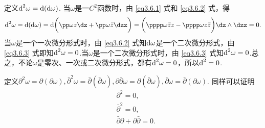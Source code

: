 定义$\textrm d^2\omega=\textrm d(\textrm d\omega)$. 当$\omega$是一$C^2$函数时，由 \eqref{eq3.6.1} 式和 \eqref{eq3.6.2} 式，得
\begin{equation}\label{eq3.6.4}
\textrm d^2\omega=\textrm d(\textrm d\omega)=\textrm d\bigg(
\pp\omega z\dz+\pp\omega{\bar z}\dzz\bigg)=\bigg(
\pppp\omega{\bar z}z-\pppp\omega z{\bar z}\bigg)\dz\wedge\dzz=0.
\end{equation}
当$\omega$是一个一次微分形式时，由 \eqref{eq3.6.2} 式知$\textrm d\omega$是一个二次微分形式，由 \eqref{eq3.6.3} 式即知$\textrm d^2\omega=0$.当$\omega$是一个二次微分形式时，由 \eqref{eq3.6.3} 式知$\textrm d^2\omega=0$.总之，不论$\omega$是零次、一次或二次微分形式，都有$\textrm d^2\omega=0$，所以$\textrm d^2=0$.

定义$\partial^2\omega=\partial(\partial\omega),\bar\partial^2\omega=
\bar\partial(\bar\partial\omega),\partial\bar\partial\omega=\partial(\bar\partial\omega),
\bar\partial\omega=\bar\partial(\partial\omega)$. 同样可以证明
\begin{equation}\label{eq3.6.5}
\begin{aligned}
&\partial^2=0,\\
&\bar\partial^2=0,\\
&\bar\partial\partial+\partial\bar\partial=0.
\end{aligned}
\end{equation}

